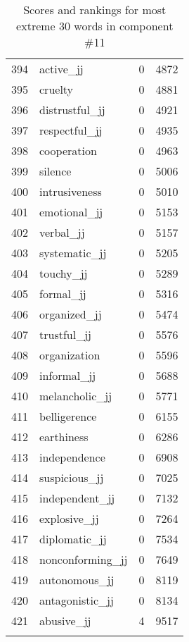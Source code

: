 \begin{longtable}[!htbp]{| rlr@{.}l |}
    394 & active\_jj & 0 & 4872 \\
    395 & cruelty & 0 & 4881 \\
    396 & distrustful\_jj & 0 & 4921 \\
    397 & respectful\_jj & 0 & 4935 \\
    398 & cooperation & 0 & 4963 \\
    399 & silence & 0 & 5006 \\
    400 & intrusiveness & 0 & 5010 \\
    401 & emotional\_jj & 0 & 5153 \\
    402 & verbal\_jj & 0 & 5157 \\
    403 & systematic\_jj & 0 & 5205 \\
    404 & touchy\_jj & 0 & 5289 \\
    405 & formal\_jj & 0 & 5316 \\
    406 & organized\_jj & 0 & 5474 \\
    407 & trustful\_jj & 0 & 5576 \\
    408 & organization & 0 & 5596 \\
    409 & informal\_jj & 0 & 5688 \\
    410 & melancholic\_jj & 0 & 5771 \\
    411 & belligerence & 0 & 6155 \\
    412 & earthiness & 0 & 6286 \\
    413 & independence & 0 & 6908 \\
    414 & suspicious\_jj & 0 & 7025 \\
    415 & independent\_jj & 0 & 7132 \\
    416 & explosive\_jj & 0 & 7264 \\
    417 & diplomatic\_jj & 0 & 7534 \\
    418 & nonconforming\_jj & 0 & 7649 \\
    419 & autonomous\_jj & 0 & 8119 \\
    420 & antagonistic\_jj & 0 & 8134 \\
    421 & abusive\_jj & 4 & 9517 \\
    \hline
    \caption{Scores and rankings for most extreme 30 words in component \#11} \\
\end{longtable}

